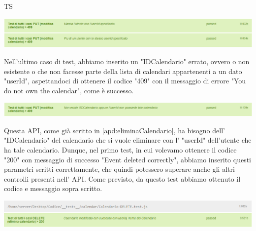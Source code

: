 \begin{listaPersonale}{TS}
                \begin{center}
                        \includegraphics[width=1\textwidth, height=0.08\textheight]{img/png/tests/CalendarioPut/409_userId_PutCalendario.png}
                \end{center}
                Nell'ultimo caso di test, abbiamo inserito un "IDCalendario" errato, ovvero o non esistente o che non facesse parte della lista di calendari appartenenti a un dato "userId", aspettandoci di ottenere il codice "409" con il messaggio di errore "You do not own the calendar", come è successo.
                \begin{center}
                        \includegraphics[width=1\textwidth, height=0.04\textheight]{img/png/tests/CalendarioPut/409_PutCalendario.png}
                \end{center}
                Questa API, come già scritto in \ref{apd:eliminaCalendario}, ha bisogno dell' "IDCalendario" del calendario che si vuole eliminare con l' "userId" dell'utente che ha tale calendario. Dunque, nel primo test, in cui volevamo ottenere il codice "200" con messaggio di successo "Event deleted correctly", abbiamo inserito questi parametri scritti correttamente, che quindi potessero superare anche gli altri controlli presenti nell' API. Come previsto, da questo test abbiamo ottenuto il codice e messaggio sopra scritto.
                \begin{center}
                        \includegraphics[width=1\textwidth, height=0.06\textheight]{img/png/tests/CalendarioDelete/200_deleteCalendario.png}

\end{center}
\end{listaPersonale}

